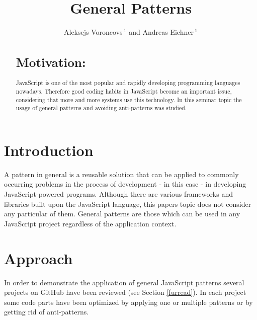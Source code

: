 \documentclass{bioinfo}
\begin{document}

\title[General Patterns]{General Patterns}
\author[Aleksejs Voroncovs \textit{and} Andreas Eichner]{Aleksejs Voroncovs\,$^{1}$ and Andreas Eichner\,$^{1}$ }%
\address{$^{1}$Department of Computer Science, Boltzmannstr. 2, 85748 Garching}

\history{}%


\maketitle

\begin{abstract}

\section{Motivation:}
JavaScript is one of the most popular and rapidly developing programming languages nowadays. Therefore good coding habits in JavaScript become an important issue, considering that more and more systems use this technology. In this seminar topic the usage of general patterns and avoiding anti-patterns was studied.


\end{abstract}

\section{Introduction}
A pattern in general is a reusable solution that can be applied to commonly occurring problems in the process of development - in this case - in developing JavaScript-powered programs. Although there are various frameworks and libraries built upon the JavaScript language, this papers topic does not consider any particular of them. General patterns are those which can be used in any JavaScript project regardless of the application context.

\section{Approach}

In order to demonstrate the application of general JavaScript patterns several projects on GitHub have been reviewed (see Section \ref{furread}). In each project some code parts have been optimized by applying one or multiple patterns or by getting rid of anti-patterns.
\end{document}
